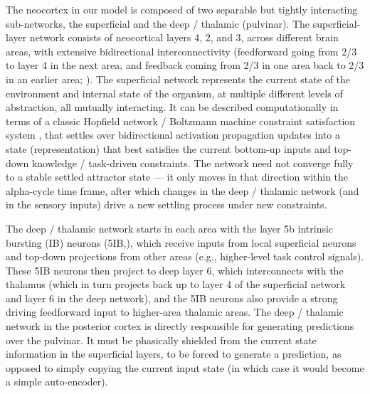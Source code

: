 \documentclass[11pt,twoside]{article}
\newif\myifpdf
\begin{document}
The neocortex in our model is composed of two separable but tightly interacting sub-networks, the superficial and the deep / thalamic (pulvinar).  The superficial-layer network consists of neocortical layers 4, 2, and 3, across different brain areas, with extensive bidirectional interconnectivity (feedforward going from 2/3 to layer 4 in the next area, and feedback coming from 2/3 in one area back to 2/3 in an earlier area; ). The superficial network represents the current state of the environment and internal state of the organism, at multiple different levels of abstraction, all mutually interacting.  It can be described computationally in terms of a classic Hopfield network / Boltzmann machine constraint satisfaction system \cite{Hopfield82,Hopfield84,AckleyHintonSejnowski85,RumelhartMcClelland82}, that settles over bidirectional activation propagation updates into a state (representation) that best satisfies the current bottom-up inputs and top-down knowledge / task-driven constraints.  The network need not converge fully to a stable settled attractor state --- it only moves in that direction within the alpha-cycle time frame, after which changes in the deep / thalamic network (and in the sensory inputs) drive a new settling process under new constraints.

The deep / thalamic network starts in each area with the layer 5b intrinsic bursting (IB) neurons (5IB,), which receive inputs from local superficial neurons and top-down projections from other areas (e.g., higher-level task control signals).  These 5IB neurons then project to deep layer 6, which interconnects with the thalamus (which in turn projects back up to layer 4 of the superficial network and layer 6 in the deep network), and the 5IB neurons also provide a strong driving feedforward input to higher-area thalamic areas. The deep / thalamic network in the posterior cortex is directly responsible for generating predictions over the pulvinar.  It must be phasically shielded from the current state information in the superficial layers, to be forced to generate a prediction, as opposed to simply copying the current input state (in which case it would become a simple auto-encoder).
\end{document}
